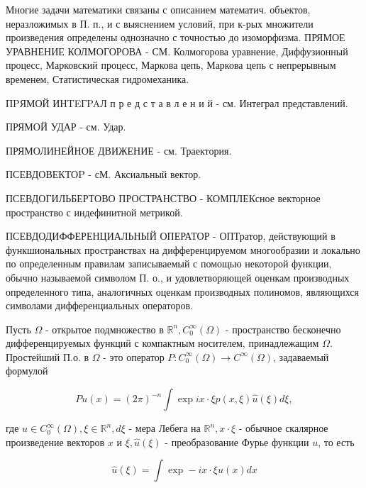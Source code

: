\documentclass[10pt]{article}
\begin{document}
Многие задачи математики связаны с описанием математич. объектов, неразложимых в П. п., и с выяснением условий, при к-рых множители произведения определены однозначно с точностью до изоморфизма. ПРЯМОЕ УРАВНЕНИЕ КОЛМОГОРОВА - СМ. Колмогорова уравнение, Диффузионный процесс, Марковский процесс, Маркова цепь, Маркова цепь с непрерывным временем, Статистическая гидромеханика.



ПPЯМОЙ ИНTEГPAЛ п р е д с т а в л е н и й - см. Интеграл представлений.



ПРЯМОЙ УДАР - см. Удар.



ПРЯМОЛИНЕЙНОЕ ДВИЖЕНИЕ - см. Траектория.



ПСЕВДОВЕКТОP - сМ. Аксиальный вектор.



ПСЕВДОГИЛЬБЕРТОВО ПРОСТРАНСТВО - КОМПЛЕКсное векторное пространство с индефинитной метрикой.



ПСЕВДОДИФФЕРЕНЦИАЛЬНЫЙ ОПЕРАТОР - ОПТратор, действующий в функшиональных пространствах на дифференцируемом многообразии и локально по определенным правилам записываемый с помощью некоторой функции, обычно называемой символом П. о., и удовлетворяющей оценкам производных определенного типа, аналогичных оценкам производных полиномов, являющихся символами дифференциальных операторов.



Пусть $\Omega$ - открытое подмножество в $\mathbb{R}^{n}, C_{0}^{\infty}(\Omega)$ - пространство бесконечно дифференцируемых функций с компактным носителем, принадлежащим $\Omega$. Простейший П.о. в $\Omega$ - это оператор $P: C_{0}^{\infty}(\Omega) \rightarrow C^{\infty}(\Omega)$, задаваемый формулой



\[

P u(x)=(2 \pi)^{-n} \int \exp i x \cdot \xi p(x, \xi) \hat{u}(\xi) d \xi,

\]



где $u \in C_{0}^{\infty}(\Omega), \xi \in \mathbb{R}^{n}, d \xi$ - мера Лебега на $\mathbb{R}^{n}, x \cdot \xi$ - обычное скалярное произведение векторов $x$ и $\xi, \hat{u}(\xi)$ - преобразование Фурье функции $u$, то есть



\[

\hat{u}(\xi)=\int \exp -i x \cdot \xi u(x) d x

\]
\end{document}
